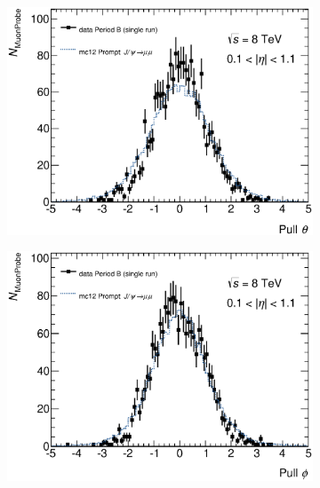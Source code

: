 \begin{figure}[htbp]
  \centering
    \begin{subfigure}[b]{0.49\textwidth}
      \includegraphics[width=\textwidth]{PartCalibration2012/Plots/DiscrepancyStudy/Pull/h_pull_theta_Nominal.eps}
      \caption{} \label{fig:CalibrationPullEta}
    \end{subfigure}
    \hfill
    \begin{subfigure}[b]{0.49\textwidth}
      \includegraphics[width=\textwidth]{PartCalibration2012/Plots/DiscrepancyStudy/Pull/h_pull_phi_Nominal.eps}
      \caption{} \label{fig:CalibrationPullPhi}
    \end{subfigure}


\end{figure}
